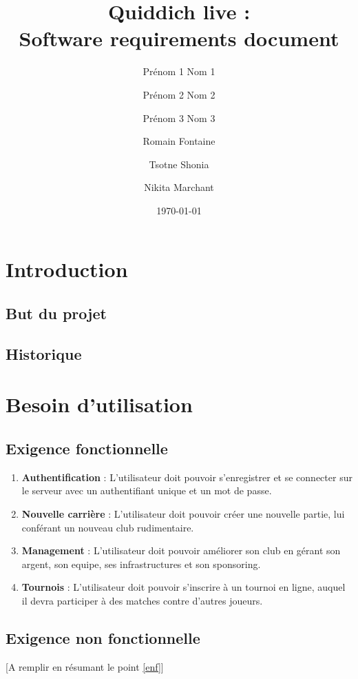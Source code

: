 \documentclass[a4paper]{article}
\title{Quiddich live : \\Software requirements document}
\author{Prénom 1 Nom 1 \and Prénom 2 Nom 2 \and Prénom 3 Nom 3 \and
Romain Fontaine \and Tsotne Shonia \and Nikita Marchant}
\date{\today}
\begin{document}
\maketitle

\section{Introduction}
\subsection{But du projet}

\printglossary[numberedsection]
\subsection{Historique}
\section{Besoin d'utilisation}
\subsection{Exigence fonctionnelle}
\begin{enumerate}
\item \textbf{Authentification} : L'utilisateur doit pouvoir s'enregistrer et se connecter sur le serveur avec un authentifiant unique et un mot de passe.
\item \textbf{Nouvelle carrière} : L'utilisateur doit pouvoir créer une nouvelle partie, lui conférant un nouveau \gls{club} rudimentaire.
\item \textbf{Management} : L'utilisateur doit pouvoir améliorer son \gls{club} en gérant son argent, son \gls{equipe}, ses infrastructures et son sponsoring.
\item \textbf{Tournois} : L'utilisateur doit pouvoir s'inscrire à un tournoi en ligne, auquel il devra participer à des matches contre d'autres joueurs.
\end{enumerate}
\subsection{Exigence non fonctionnelle}
[A remplir en résumant le point \ref{enf}]
\end{document}
